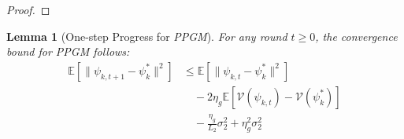 \documentclass[lettersize,journal]{IEEEtran}
\newtheorem{lemma}{Lemma}
\newtheorem{proof}{Proof}
\begin{document}
\begin{proof}





\end{proof}

\begin{lemma}[One-step Progress for \emph{PPGM}]
\label{lemma:2}
For any round $t \geq 0$, the convergence bound for \emph{PPGM} follows:
\begin{equation}
\begin{split}
    \mathbb{E}[\|\psi_{k,t+1} - \psi_k^*\|^2]
    &\leq \mathbb{E}[\|\psi_{k,t} - \psi_k^*\|^2]\\
    &\quad - 2\eta_g \mathbb{E}[\mathcal{V}(\psi_{k,t}) - \mathcal{V}(\psi_k^*)] \\
    &\quad - \frac{\eta_g}{L_2} \sigma_2^2 + \eta_g^2 \sigma_2^2
\end{split}
\end{equation}
\end{lemma}
\end{document}
